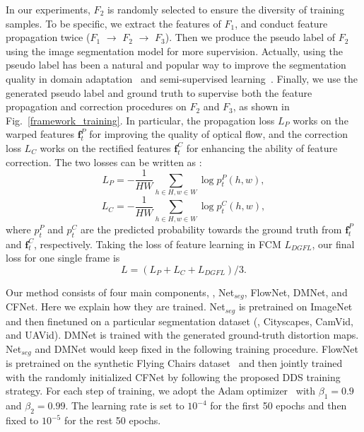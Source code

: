 \documentclass[journal]{IEEEtran}
\begin{document}
In our experiments,  $F_{2}$ is randomly selected to ensure the diversity of training samples. To be specific, we extract the features of $F_{1}$, and conduct feature propagation twice ($F_1$ $\rightarrow$ $F_2$ $\rightarrow$ $F_3$).  Then we produce the pseudo label of $F_2$ using the image segmentation model for more supervision. Actually, using the pseudo label has been a natural and popular way to improve the segmentation quality in domain adaptation~\cite{zou2018unsupervised} and semi-supervised learning~\cite{hungadversarial}. Finally, we use the generated pseudo label and ground truth to supervise both the feature propagation and correction procedures on $F_{2}$ and $F_{3}$, as shown in Fig.~\ref{framework_training}. In particular, the propagation loss $L_{P}$ works on the warped features $\mathbf{f}_{t}^{P}$ for improving the quality of optical flow, and the correction loss $L_{C}$ works on the rectified features $\mathbf{f}_{t}^{C}$ for enhancing the ability of feature correction. The two losses can be written as :
\begin{equation}
L_{P}=-\frac{1}{HW}\sum_{h \in H,w \in W}\log{p^{P}_{t}(h,w)},
\end{equation}
\begin{equation}
L_{C}=-\frac{1}{HW}\sum_{h \in H,w \in W}\log{p^{C}_{t}(h,w)},
\end{equation}
where $p^{P}_{t}$ and $p^{C}_{t}$ are the predicted probability towards the ground truth from $\mathbf{f}^{P}_{t}$ and $\mathbf{f}^{C}_{t}$, respectively.
Taking the loss of feature learning in FCM $L_{DGFL}$, our final loss for one single frame is
\begin{equation}
L=(L_{P}+L_{C}+L_{DGFL})/3.
\end{equation}

Our method consists of four main components, \ie, Net$_{seg}$, FlowNet, DMNet, and CFNet. Here we explain how they are trained. Net$_{seg}$ is pretrained on ImageNet and then finetuned on a particular segmentation dataset (\eg, Cityscapes, CamVid, and UAVid). DMNet is trained with the generated ground-truth distortion maps. Net$_{seg}$ and DMNet would keep fixed in the following training procedure. FlowNet is pretrained on the synthetic Flying Chairs dataset~\cite{dosovitskiy2015flownet} and then jointly trained with the randomly initialized CFNet by following the proposed DDS training strategy.  For each step of training, we adopt the Adam optimizer~\cite{kingma2014adam} with $\beta_{1}=0.9$ and $\beta_{2}=0.99$. The learning rate is set to $10^{-4}$ for the first 50 epochs and then fixed to $10^{-5}$ for the rest 50 epochs.
\end{document}

